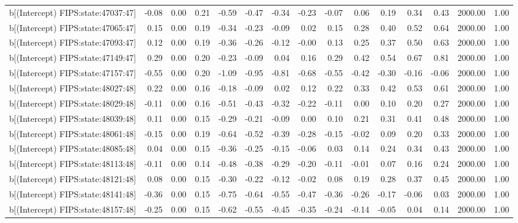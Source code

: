 \begin{table}[ht]
\begin{tabular}{rrrrrrrrrrrrrrr}
  b[(Intercept) FIPS:state:47037:47] & -0.08 & 0.00 & 0.21 & -0.59 & -0.47 & -0.34 & -0.23 & -0.07 & 0.06 & 0.19 & 0.34 & 0.43 & 2000.00 & 1.00 \\ 
  b[(Intercept) FIPS:state:47065:47] & 0.15 & 0.00 & 0.19 & -0.34 & -0.23 & -0.09 & 0.02 & 0.15 & 0.28 & 0.40 & 0.52 & 0.64 & 2000.00 & 1.00 \\ 
  b[(Intercept) FIPS:state:47093:47] & 0.12 & 0.00 & 0.19 & -0.36 & -0.26 & -0.12 & -0.00 & 0.13 & 0.25 & 0.37 & 0.50 & 0.63 & 2000.00 & 1.00 \\ 
  b[(Intercept) FIPS:state:47149:47] & 0.29 & 0.00 & 0.20 & -0.23 & -0.09 & 0.04 & 0.16 & 0.29 & 0.42 & 0.54 & 0.67 & 0.81 & 2000.00 & 1.00 \\ 
  b[(Intercept) FIPS:state:47157:47] & -0.55 & 0.00 & 0.20 & -1.09 & -0.95 & -0.81 & -0.68 & -0.55 & -0.42 & -0.30 & -0.16 & -0.06 & 2000.00 & 1.00 \\ 
  b[(Intercept) FIPS:state:48027:48] & 0.22 & 0.00 & 0.16 & -0.18 & -0.09 & 0.02 & 0.12 & 0.22 & 0.33 & 0.42 & 0.53 & 0.61 & 2000.00 & 1.00 \\ 
  b[(Intercept) FIPS:state:48029:48] & -0.11 & 0.00 & 0.16 & -0.51 & -0.43 & -0.32 & -0.22 & -0.11 & 0.00 & 0.10 & 0.20 & 0.27 & 2000.00 & 1.00 \\ 
  b[(Intercept) FIPS:state:48039:48] & 0.11 & 0.00 & 0.15 & -0.29 & -0.21 & -0.09 & 0.00 & 0.10 & 0.21 & 0.31 & 0.41 & 0.48 & 2000.00 & 1.00 \\ 
  b[(Intercept) FIPS:state:48061:48] & -0.15 & 0.00 & 0.19 & -0.64 & -0.52 & -0.39 & -0.28 & -0.15 & -0.02 & 0.09 & 0.20 & 0.33 & 2000.00 & 1.00 \\ 
  b[(Intercept) FIPS:state:48085:48] & 0.04 & 0.00 & 0.15 & -0.36 & -0.25 & -0.15 & -0.06 & 0.03 & 0.14 & 0.24 & 0.34 & 0.43 & 2000.00 & 1.00 \\ 
  b[(Intercept) FIPS:state:48113:48] & -0.11 & 0.00 & 0.14 & -0.48 & -0.38 & -0.29 & -0.20 & -0.11 & -0.01 & 0.07 & 0.16 & 0.24 & 2000.00 & 1.00 \\ 
  b[(Intercept) FIPS:state:48121:48] & 0.08 & 0.00 & 0.15 & -0.30 & -0.22 & -0.12 & -0.02 & 0.08 & 0.19 & 0.28 & 0.37 & 0.45 & 2000.00 & 1.00 \\ 
  b[(Intercept) FIPS:state:48141:48] & -0.36 & 0.00 & 0.15 & -0.75 & -0.64 & -0.55 & -0.47 & -0.36 & -0.26 & -0.17 & -0.06 & 0.03 & 2000.00 & 1.00 \\ 
  b[(Intercept) FIPS:state:48157:48] & -0.25 & 0.00 & 0.15 & -0.62 & -0.55 & -0.45 & -0.35 & -0.24 & -0.14 & -0.05 & 0.04 & 0.14 & 2000.00 & 1.00 \\ 

\end{tabular}
\end{table}

